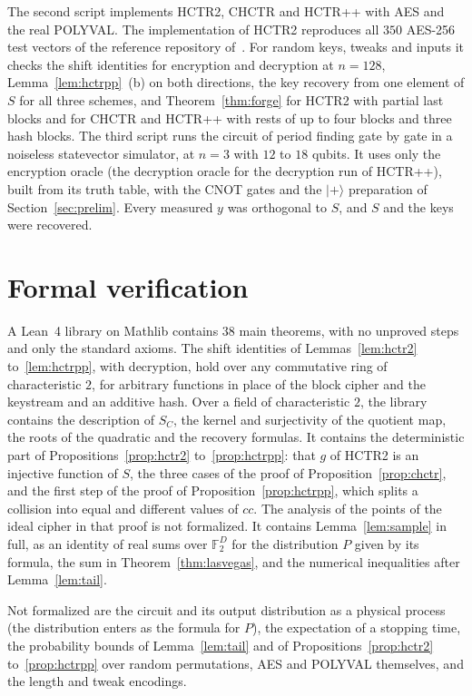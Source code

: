 \documentclass[11pt]{article}
\theoremstyle{definition}
\theoremstyle{remark}
\newcommand{\F}{\mathbb{F}}
\begin{document}
The second script implements HCTR2, CHCTR and HCTR++ with AES and the real POLYVAL. The implementation of HCTR2 reproduces all $350$ AES-256 test vectors of the reference repository of~\cite{CHB21}. For random keys, tweaks and inputs it checks the shift identities for encryption and decryption at $n=128$, Lemma~\ref{lem:hctrpp}~(b) on both directions, the key recovery from one element of $S$ for all three schemes, and Theorem~\ref{thm:forge} for HCTR2 with partial last blocks and for CHCTR and HCTR++ with rests of up to four blocks and three hash blocks. The third script runs the circuit of period finding gate by gate in a noiseless statevector simulator, at $n=3$ with $12$ to $18$ qubits. It uses only the encryption oracle (the decryption oracle for the decryption run of HCTR++), built from its truth table, with the CNOT gates and the $|{+}\rangle$ preparation of Section~\ref{sec:prelim}. Every measured $y$ was orthogonal to $S$, and $S$ and the keys were recovered.

\section{Formal verification}\label{sec:lean}

A Lean~4 library on Mathlib contains $38$ main theorems, with no unproved steps and only the standard axioms. The shift identities of Lemmas~\ref{lem:hctr2} to~\ref{lem:hctrpp}, with decryption, hold over any commutative ring of characteristic $2$, for arbitrary functions in place of the block cipher and the keystream and an additive hash. Over a field of characteristic $2$, the library contains the description of $S_C$, the kernel and surjectivity of the quotient map, the roots of the quadratic and the recovery formulas. It contains the deterministic part of Propositions~\ref{prop:hctr2} to~\ref{prop:hctrpp}: that $g$ of HCTR2 is an injective function of $S$, the three cases of the proof of Proposition~\ref{prop:chctr}, and the first step of the proof of Proposition~\ref{prop:hctrpp}, which splits a collision into equal and different values of $cc$. The analysis of the points of the ideal cipher in that proof is not formalized. It contains Lemma~\ref{lem:sample} in full, as an identity of real sums over $\F_2^D$ for the distribution $P$ given by its formula, the sum in Theorem~\ref{thm:lasvegas}, and the numerical inequalities after Lemma~\ref{lem:tail}.

Not formalized are the circuit and its output distribution as a physical process (the distribution enters as the formula for $P$), the expectation of a stopping time, the probability bounds of Lemma~\ref{lem:tail} and of Propositions~\ref{prop:hctr2} to~\ref{prop:hctrpp} over random permutations, AES and POLYVAL themselves, and the length and tweak encodings.
\end{document}
